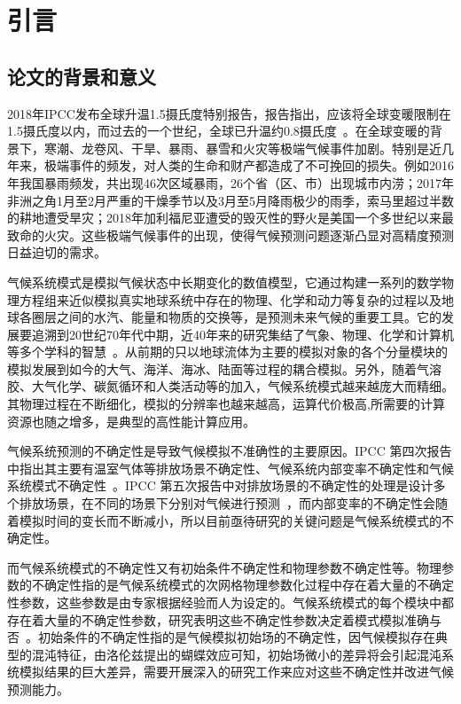 \chapter{引言}
\label{cha:intro}

\section{论文的背景和意义}

2018年IPCC发布全球升温1.5摄氏度特别报告，报告指出，应该将全球变暖限制在1.5摄氏度以内，而过去的一个世纪，全球已升温约0.8摄氏度~\cite{globalWarming}。在全球变暖的背景下，寒潮、龙卷风、干旱、暴雨、暴雪和火灾等极端气候事件加剧。特别是近几年来，极端事件的频发，对人类的生命和财产都造成了不可挽回的损失。例如2016年我国暴雨频发，共出现46次区域暴雨，26个省（区、市）出现城市内涝；2017年非洲之角1月至2月严重的干燥季节以及3月至5月降雨极少的雨季，索马里超过半数的耕地遭受旱灾；2018年加利福尼亚遭受的毁灭性的野火是美国一个多世纪以来最致命的火灾。这些极端气候事件的出现，使得气候预测问题逐渐凸显对高精度预测日益迫切的需求。

气候系统模式是模拟气候状态中长期变化的数值模型，它通过构建一系列的数学物理方程组来近似模拟真实地球系统中存在的物理、化学和动力等复杂的过程以及地球各圈层之间的水汽、能量和物质的交换等，是预测未来气候的重要工具。它的发展要追溯到20世纪70年代中期，近40年来的研究集结了气象、物理、化学和计算机等多个学科的智慧~\cite{modelprogress}。从前期的只以地球流体为主要的模拟对象的各个分量模块的模拟发展到如今的大气、海洋、海冰、陆面等过程的耦合模拟。另外，随着气溶胶、大气化学、碳氮循环和人类活动等的加入，气候系统模式越来越庞大而精细。其物理过程在不断细化，模拟的分辨率也越来越高，运算代价极高,所需要的计算资源也随之增多，是典型的高性能计算应用。


气候系统预测的不确定性是导致气候模拟不准确性的主要原因。IPCC 第四次报告中指出其主要有温室气体等排放场景不确定性、气候系统内部变率不确定性和气候系统模式不确定性~\cite{hawkins2009potential}。IPCC 第五次报告中对排放场景的不确定性的处理是设计多个排放场景，在不同的场景下分别对气候进行预测~\cite{moss2010next}，而内部变率的不确定性会随着模拟时间的变长而不断减小，所以目前亟待研究的关键问题是气候系统模式的不确定性。

而气候系统模式的不确定性又有初始条件不确定性和物理参数不确定性等。物理参数的不确定性指的是气候系统模式的次网格物理参数化过程中存在着大量的不确定性参数，这些参数是由专家根据经验而人为设定的。气候系统模式的每个模块中都存在着大量的不确定性参数，研究表明这些不确定性参数决定着模式模拟准确与否~\cite{mastrandrea2011ipcc}。初始条件的不确定性指的是气候模拟初始场的不确定性，因气候模拟存在典型的混沌特征，由洛伦兹提出的蝴蝶效应可知，初始场微小的差异将会引起混沌系统模拟结果的巨大差异，需要开展深入的研究工作来应对这些不确定性并改进气候预测能力。

